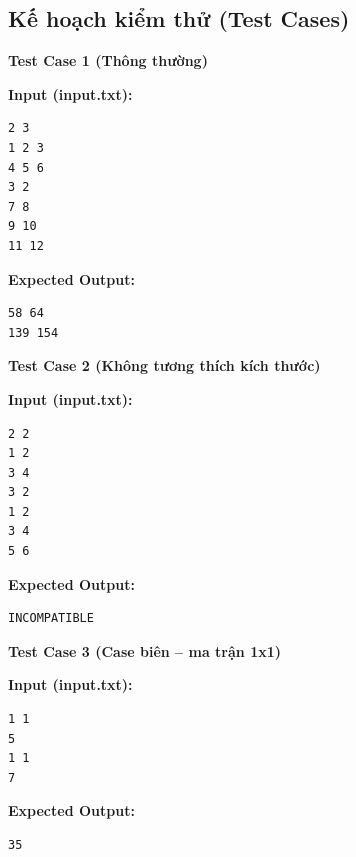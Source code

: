 \subsection{Kế hoạch kiểm thử (Test Cases)}

\textbf{Test Case 1 (Thông thường)}

\textbf{Input (input.txt):}
\begin{lstlisting}
2 3
1 2 3
4 5 6
3 2
7 8
9 10
11 12
\end{lstlisting}

\textbf{Expected Output:}
\begin{lstlisting}
58 64
139 154
\end{lstlisting}

\vspace{0.5cm}

\textbf{Test Case 2 (Không tương thích kích thước)}

\textbf{Input (input.txt):}
\begin{lstlisting}
2 2
1 2
3 4
3 2
1 2
3 4
5 6
\end{lstlisting}

\textbf{Expected Output:}
\begin{lstlisting}
INCOMPATIBLE
\end{lstlisting}

\vspace{0.5cm}

\textbf{Test Case 3 (Case biên -- ma trận 1x1)}

\textbf{Input (input.txt):}
\begin{lstlisting}
1 1
5
1 1
7
\end{lstlisting}

\textbf{Expected Output:}
\begin{lstlisting}
35
\end{lstlisting}